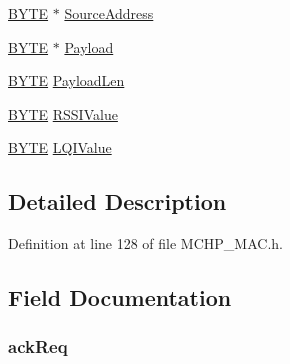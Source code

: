 \begin{DoxyCompactItemize}
\begin{tabbing}
\end{tabbing}\item 
\hyperlink{_generic_type_defs_8h_a4ae1dab0fb4b072a66584546209e7d58}{B\+Y\+T\+E} $\ast$ \hyperlink{struct_m_a_c___r_e_c_e_i_v_e_d___p_a_c_k_e_t_a74f4c6eb6c47cbaa15f9c3861ad8574f}{Source\+Address}
\item 
\hyperlink{_generic_type_defs_8h_a4ae1dab0fb4b072a66584546209e7d58}{B\+Y\+T\+E} $\ast$ \hyperlink{struct_m_a_c___r_e_c_e_i_v_e_d___p_a_c_k_e_t_abccf8a840583e2a3de0a3681da6e7cd4}{Payload}
\item 
\hyperlink{_generic_type_defs_8h_a4ae1dab0fb4b072a66584546209e7d58}{B\+Y\+T\+E} \hyperlink{struct_m_a_c___r_e_c_e_i_v_e_d___p_a_c_k_e_t_a3e4181ee4aab3ed048c3def048d840ab}{Payload\+Len}
\item 
\hyperlink{_generic_type_defs_8h_a4ae1dab0fb4b072a66584546209e7d58}{B\+Y\+T\+E} \hyperlink{struct_m_a_c___r_e_c_e_i_v_e_d___p_a_c_k_e_t_a34c2248f7928a3f59a8a211a051ae2c0}{R\+S\+S\+I\+Value}
\item 
\hyperlink{_generic_type_defs_8h_a4ae1dab0fb4b072a66584546209e7d58}{B\+Y\+T\+E} \hyperlink{struct_m_a_c___r_e_c_e_i_v_e_d___p_a_c_k_e_t_a03c6d7bc86aaee25e11a68e57608ddcc}{L\+Q\+I\+Value}
\end{DoxyCompactItemize}


\subsection{Detailed Description}


Definition at line 128 of file M\+C\+H\+P\+\_\+\+M\+A\+C.\+h.



\subsection{Field Documentation}
\hypertarget{struct_m_a_c___r_e_c_e_i_v_e_d___p_a_c_k_e_t_ad6d800fe3f8e6e8dba107e2c4df200c0}{}
\subsubsection[{ack\+Req}]{ ack\+Req}\label{struct_m_a_c___r_e_c_e_i_v_e_d___p_a_c_k_e_t_ad6d800fe3f8e6e8dba107e2c4df200c0}


